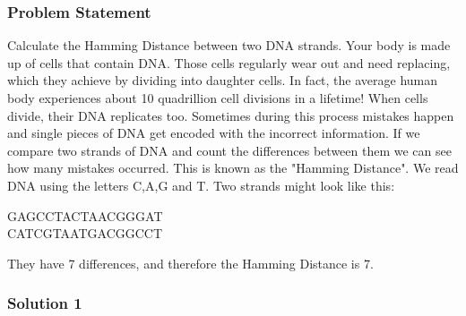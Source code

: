 \documentclass{report}
\begin{document}
    \subsubsection{Problem Statement}
    \bigbreak \noindent 
    Calculate the Hamming Distance between two DNA strands.
    \bigbreak \noindent 
    Your body is made up of cells that contain DNA. Those cells regularly wear out and need replacing, which they achieve by dividing into daughter cells. In fact, the average human body experiences about 10 quadrillion cell divisions in a lifetime!
    \bigbreak \noindent 
    When cells divide, their DNA replicates too. Sometimes during this process mistakes happen and single pieces of DNA get encoded with the incorrect information. If we compare two strands of DNA and count the differences between them we can see how many mistakes occurred. This is known as the "Hamming Distance".
    \bigbreak \noindent 
    We read DNA using the letters C,A,G and T. Two strands might look like this:
    \bigbreak \noindent 
    \begin{center}
        GAGCCTACTAACGGGAT \\
        CATCGTAATGACGGCCT \\
    \end{center}
    They have 7 differences, and therefore the Hamming Distance is 7.
    \bigbreak \noindent 
    \subsubsection{Solution 1}
    \bigbreak \noindent 

    \bigbreak \noindent 
\end{document}
